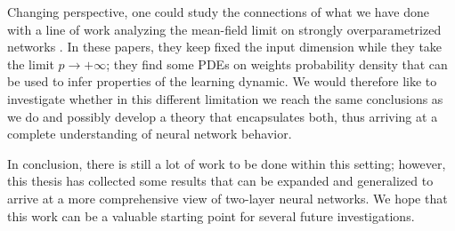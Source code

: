 Changing perspective, one could study the connections of what we have done with a line of work analyzing the mean-field limit on strongly overparametrized networks \cite{mei2018mean, chizat2018global,rotskoff2018trainability, sirignano2020mean}.
In these papers, they keep fixed the input dimension while they take the limit \(p\to+\infty\);
they find some PDEs on weights probability density that can be used to infer properties of the learning dynamic.
We would therefore like to investigate whether in this different limitation we reach the same conclusions as we do and possibly develop a theory that encapsulates both,
thus arriving at a complete understanding of neural network behavior.

In conclusion, there is still a lot of work to be done within this setting; however, this thesis has collected some results that can be expanded and generalized to arrive at a more comprehensive view of two-layer neural networks. We hope that this work can be a valuable starting point for several future investigations.